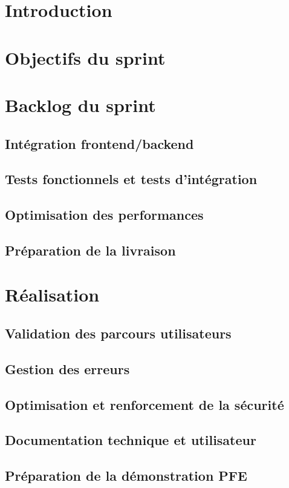 \documentclass[12pt,a4paper]{report}
\begin{document}
\section{Introduction}
\section{Objectifs du sprint}
\section{Backlog du sprint}
\subsection{Intégration frontend/backend}
\subsection{Tests fonctionnels et tests d'intégration}
\subsection{Optimisation des performances}
\subsection{Préparation de la livraison}
\section{Réalisation}
\subsection{Validation des parcours utilisateurs}
\subsection{Gestion des erreurs}
\subsection{Optimisation et renforcement de la sécurité}
\subsection{Documentation technique et utilisateur}
\subsection{Préparation de la démonstration PFE}
\end{document}
